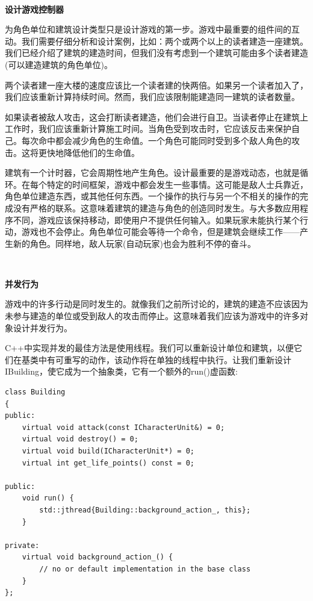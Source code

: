 \noindent\textbf{}\ \par
\textbf{设计游戏控制器} \ \par
为角色单位和建筑设计类型只是设计游戏的第一步。游戏中最重要的组件间的互动。我们需要仔细分析和设计案例，比如：两个或两个以上的读者建造一座建筑。我们已经介绍了建筑的建造时间，但我们没有考虑到一个建筑可能由多个读者建造(可以建造建筑的角色单位)。 \par
两个读者建一座大楼的速度应该比一个读者建的快两倍。如果另一个读者加入了，我们应该重新计算持续时间。然而，我们应该限制能建造同一建筑的读者数量。 \par
如果读者被敌人攻击，这会打断读者建造，他们会进行自卫。当读者停止在建筑上工作时，我们应该重新计算施工时间。当角色受到攻击时，它应该反击来保护自己。每次命中都会减少角色的生命值。一个角色可能同时受到多个敌人角色的攻击。这将更快地降低他们的生命值。 \par
建筑有一个计时器，它会周期性地产生角色。设计最重要的是游戏动态，也就是循环。在每个特定的时间框架，游戏中都会发生一些事情。这可能是敌人士兵靠近，角色单位建造东西，或其他任何东西。一个操作的执行与另一个不相关的操作的完成没有严格的联系。这意味着建筑的建造与角色的创造同时发生。与大多数应用程序不同，游戏应该保持移动，即使用户不提供任何输入。如果玩家未能执行某个行动，游戏也不会停止。角色单位可能会等待一个命令，但是建筑会继续工作——产生新的角色。同样地，敌人玩家(自动玩家)也会为胜利不停的奋斗。 \par

\noindent\textbf{}\ \par
\textbf{并发行为} \ \par
游戏中的许多行动是同时发生的。就像我们之前所讨论的，建筑的建造不应该因为未参与建造的单位或受到敌人的攻击而停止。这意味着我们应该为游戏中的许多对象设计并发行为。 \par
C++中实现并发的最佳方法是使用线程。我们可以重新设计单位和建筑，以便它们在基类中有可重写的动作，该动作将在单独的线程中执行。让我们重新设计IBuilding，使它成为一个抽象类，它有一个额外的run()虚函数: \par

\begin{lstlisting}[caption={}]
class Building
{
public:
	virtual void attack(const ICharacterUnit&) = 0;
	virtual void destroy() = 0;
	virtual void build(ICharacterUnit*) = 0;
	virtual int get_life_points() const = 0;
	
public:
	void run() {
		std::jthread{Building::background_action_, this};
	}

private:
	virtual void background_action_() {
		// no or default implementation in the base class
	}
};
\end{lstlisting}

